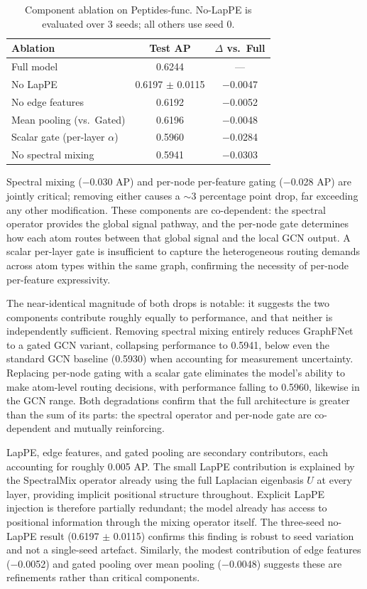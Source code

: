 \documentclass[10pt]{article}
\begin{document}
\begin{table}[t]
\caption{Component ablation on Peptides-func. No-LapPE is evaluated over 3 seeds; all others use seed 0.}
\label{tab:ablation}
\centering
\begin{tabular}{lcc}
\toprule
\textbf{Ablation} & \textbf{Test AP} & \textbf{$\Delta$ vs.\ Full} \\
\midrule
Full model                       & 0.6244             & ---       \\
No LapPE                         & 0.6197 $\pm$ 0.0115 & $-$0.0047 \\
No edge features                 & 0.6192             & $-$0.0052 \\
Mean pooling (vs.\ Gated)        & 0.6196             & $-$0.0048 \\
Scalar gate (per-layer $\alpha$) & 0.5960             & $-$0.0284 \\
No spectral mixing               & 0.5941             & $-$0.0303 \\
\bottomrule
\end{tabular}
\end{table}

Spectral mixing ($-$0.030 AP) and per-node per-feature gating ($-$0.028 AP) are jointly critical; removing either causes a ${\sim}3$ percentage point drop, far exceeding any other modification. These components are co-dependent: the spectral operator provides the global signal pathway, and the per-node gate determines how each atom routes between that global signal and the local GCN output. A scalar per-layer gate is insufficient to capture the heterogeneous routing demands across atom types within the same graph, confirming the necessity of per-node per-feature expressivity.

The near-identical magnitude of both drops is notable: it suggests the two components contribute roughly equally to performance, and that neither is independently sufficient. Removing spectral mixing entirely reduces GraphFNet to a gated GCN variant, collapsing performance to 0.5941, below even the standard GCN baseline (0.5930) when accounting for measurement uncertainty. Replacing per-node gating with a scalar gate eliminates the model's ability to make atom-level routing decisions, with performance falling to 0.5960, likewise in the GCN range. Both degradations confirm that the full architecture is greater than the sum of its parts: the spectral operator and per-node gate are co-dependent and mutually reinforcing.

LapPE, edge features, and gated pooling are secondary contributors, each accounting for roughly 0.005 AP. The small LapPE contribution is explained by the SpectralMix operator already using the full Laplacian eigenbasis $U$ at every layer, providing implicit positional structure throughout. Explicit LapPE injection is therefore partially redundant; the model already has access to positional information through the mixing operator itself. The three-seed no-LapPE result (0.6197 $\pm$ 0.0115) confirms this finding is robust to seed variation and not a single-seed artefact. Similarly, the modest contribution of edge features ($-$0.0052) and gated pooling over mean pooling ($-$0.0048) suggests these are refinements rather than critical components.
\end{document}
